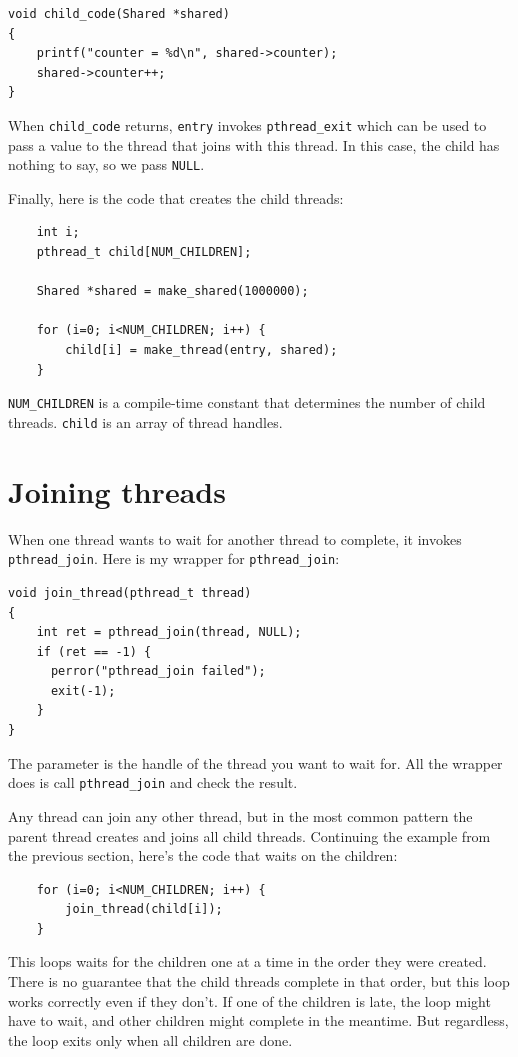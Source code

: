 \documentclass[12pt]{book}
\begin{document}
{\begin{verbatim}
void child_code(Shared *shared)
{  
    printf("counter = %d\n", shared->counter);
    shared->counter++;
}
\end{verbatim}

When {\tt child\_code} returns, {\tt entry} invokes
\verb"pthread_exit" which can be used to pass a value to the thread
that joins with this thread.  In this case, the child has nothing to
say, so we pass {\tt NULL}.

Finally, here is the code that creates the child threads:

\begin{verbatim}
    int i;
    pthread_t child[NUM_CHILDREN];

    Shared *shared = make_shared(1000000);

    for (i=0; i<NUM_CHILDREN; i++) {
        child[i] = make_thread(entry, shared);
    }
\end{verbatim}

\verb"NUM_CHILDREN" is a compile-time constant that determines
the number of child threads.  {\tt child} is an array of
thread handles.


\section{Joining threads}

When one thread wants to wait for another thread to complete,
it invokes {\tt pthread\_join}.
Here is my wrapper for {\tt pthread\_join}:

\begin{verbatim}
void join_thread(pthread_t thread)
{
    int ret = pthread_join(thread, NULL);
    if (ret == -1) {
      perror("pthread_join failed");
      exit(-1);
    }
}
\end{verbatim}

The parameter is the handle of the thread you want to wait for.
All the wrapper does is call {\tt pthread\_join} and check the
result.

Any thread can join any other thread, but in the most common pattern
the parent thread creates and joins all child threads.
Continuing the example from the previous section, here's the
code that waits on the children:

\begin{verbatim}
    for (i=0; i<NUM_CHILDREN; i++) {
        join_thread(child[i]);
    }
\end{verbatim}

This loops waits for the children one at a time in the order they
were created.  There is no guarantee that the child threads complete 
in that order, but this loop works correctly even if they don't.  If one
of the children is late, the loop might have to wait, and other children
might complete in the meantime.  But regardless, the loop exits
only when all children are done.

}
\end{document}
